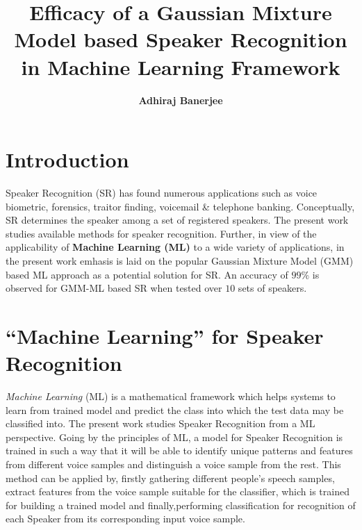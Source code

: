 \documentclass{article}
\title{\textbf{Efficacy of a Gaussian Mixture Model based Speaker Recognition in Machine Learning Framework}}
\author{\textbf{Adhiraj Banerjee}}
\begin{document}
\maketitle

\section{\textbf{{Introduction}}}
Speaker Recognition (SR) has found numerous applications such as voice biometric, forensics, traitor finding, voicemail \& telephone banking. Conceptually, SR determines the speaker among a set of registered speakers. The present work studies available methods for speaker recognition. Further, in view of the applicability of \textbf{Machine Learning (ML)} to a wide variety of applications, in the present work emhasis is laid on the popular Gaussian Mixture Model (GMM) based ML approach as a potential solution for SR. An accuracy of $99\%$ is observed for GMM-ML based SR when tested over $10$ sets of speakers.

\section{\textbf{{``Machine Learning'' for Speaker Recognition}}}
 \textit{Machine Learning} (ML) is a mathematical framework which helps systems to learn from trained model and predict the class into which the test data may be classified into. 
The present work studies Speaker Recognition from a ML perspective. Going by the principles of ML, a model for Speaker Recognition is trained in such a way that it will be able to identify unique patterns and features from different voice samples and distinguish a voice sample from the rest. This method can be applied by, firstly {gathering different people's speech samples}, {extract features from the voice sample} suitable for the classifier, which is {trained for building a trained model} and finally,{performing classification for recognition of each Speaker} from its corresponding input voice sample.
\end{document}
